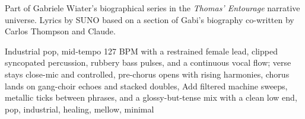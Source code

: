 
\begin{notes}
Part of Gabriele Wiater's biographical series in the \emph{Thomas’ Entourage} narrative universe. Lyrics by SUNO based on a section of Gabi's biography co-written by Carlos Thompson and Claude.
\end{notes}
\begin{style}
Industrial pop, mid-tempo 127 BPM with a restrained female lead, clipped syncopated percussion, rubbery bass pulses, and a continuous vocal flow; verse stays close-mic and controlled, pre-chorus opens with rising harmonies, chorus lands on gang-choir echoes and stacked doubles, Add filtered machine sweeps, metallic ticks between phrases, and a glossy-but-tense mix with a clean low end, pop, industrial, healing, mellow, minimal
\end{style}
